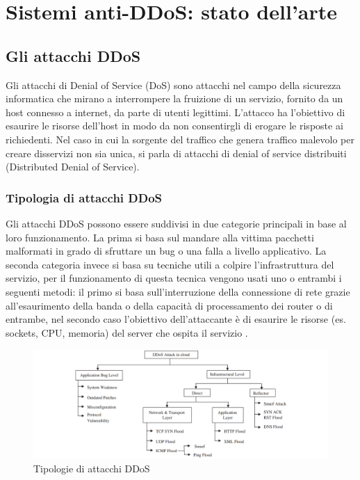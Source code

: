 
\chapter{Sistemi anti-DDoS: stato dell'arte}

\section{Gli attacchi DDoS}

Gli attacchi di Denial of Service (DoS) sono attacchi nel campo della sicurezza informatica che mirano a interrompere la fruizione di un servizio, fornito da un host connesso a internet, da parte di utenti legittimi. L'attacco ha l'obiettivo di esaurire le risorse dell'host in modo da non consentirgli di erogare le risposte ai richiedenti.
Nel caso in cui la sorgente del traffico che genera traffico malevolo per creare disservizi non sia unica, si parla di attacchi di denial of service distribuiti (Distributed Denial of Service).

\subsection{Tipologia di attacchi DDoS}
    
Gli attacchi DDoS possono essere suddivisi in due categorie principali in base al loro funzionamento. La prima si basa sul mandare alla vittima pacchetti malformati in grado di sfruttare un bug o una falla a livello applicativo. La seconda categoria invece si basa su tecniche utili a colpire l'infrastruttura del servizio, per il funzionamento di questa tecnica vengono usati uno o entrambi i seguenti metodi: il primo si basa sull'interruzione della connessione di rete grazie all'esaurimento della banda o della capacità di processamento dei router o di entrambe, nel secondo caso l'obiettivo dell'attaccante è di esaurire le risorse (es. sockets, CPU, memoria) del server che ospita il servizio \cite{ddos_survey_1}.

\begin{figure}[h]

    \includegraphics[width=\hsize]{images/introduzione/tipologie_ddos.png}
    \caption{Tipologie di attacchi DDoS \cite{ddos_survey_3}}
    \centering
\end{figure}

